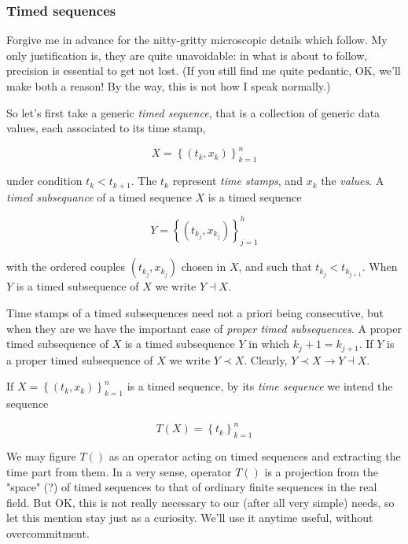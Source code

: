 \documentclass[a4paper,10pt]{book}
\begin{document}
\subsubsection{Timed sequences}

Forgive me in advance for the nitty-gritty microscopic details which follow. My only justification is, they are quite unavoidable: in what is about to follow, precision is essential to get not lost. (If you still find me quite pedantic, OK, we'll make both a reason! By the way, this is not how I speak normally.)

So let's first take a generic \emph{timed sequence}, that is a collection of generic data values, each associated to its time stamp,

\begin{equation}\label{eq:Timed sequence}
	X = \left\{(t_{k},x_{k})\right\}_{k=1}^{n}
\end{equation}

\noindent under condition $t_{k} < t_{k+1}$. The $t_{k}$ represent \emph{time stamps}, and $x_{k}$ the \emph{values}. A \emph{timed subsequance} of a timed sequence $X$ is a timed sequence

\begin{equation}\label{eq:Timed subsequence}
	Y = \left\{(t_{k_{j}},x_{k_{j}})\right\}_{j=1}^{h}
\end{equation}

\noindent with the ordered couples $(t_{k_{j}},x_{k_{j}})$ chosen in $X$, and such that $t_{k_{j}} < t_{k_{j+1}}$. When $Y$ is a timed subsequence of $X$ we write $Y \dashv X$.

Time stamps of a timed subsequences need not a priori being consecutive, but when they are we have the important case of \emph{proper timed subsequences}. A proper timed subsequence of $X$ is a timed subsequence $Y$ in which $k_{j} + 1 = k_{j+1}$. If $Y$ is a proper timed subsequence of $X$ we write $Y \prec X$. Clearly, $Y \prec X \rightarrow Y \dashv X$.

If $X = \left\{(t_{k},x_{k})\right\}_{k=1}^{n}$ is a timed sequence, by its \emph{time sequence} we intend the sequence

\begin{equation}\label{eq:Time sequence}
	T(X) = \left\{t_{k}\right\}_{k=1}^{n}
\end{equation}

We may figure $T()$ as an operator acting on timed sequences and extracting the time part from them. In a very sense, operator $T()$ is a projection from the "space" (?) of timed sequences to that of ordinary finite sequences in the real field. But OK, this is not really necessary to our (after all very simple) needs, so let this mention stay just as a curiosity. We'll use it anytime useful, without overcommitment.
\end{document}

